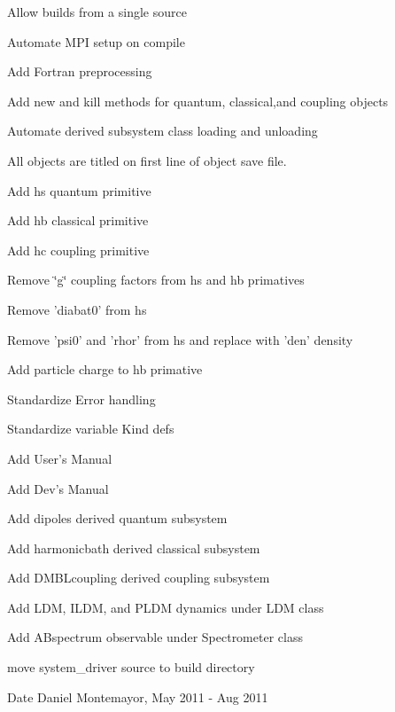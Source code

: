 \begin{DoxyItemize}
\item Allow builds from a single source
\item Automate M\+P\+I setup on compile
\item Add Fortran preprocessing
\item Add new and kill methods for quantum, classical,and coupling objects
\item Automate derived subsystem class loading and unloading
\item All objects are titled on first line of object save file.
\item Add hs quantum primitive
\item Add hb classical primitive
\item Add hc coupling primitive
\item Remove \char`\"{}g\char`\"{} coupling factors from hs and hb primatives
\item Remove 'diabat0' from hs
\item Remove 'psi0' and 'rhor' from hs and replace with 'den' density
\item Add particle charge to hb primative
\item Standardize Error handling
\item Standardize variable Kind defs
\item Add User's Manual
\item Add Dev's Manual
\item Add dipoles derived quantum subsystem
\item Add harmonicbath derived classical subsystem
\item Add D\+M\+B\+Lcoupling derived coupling subsystem
\item Add L\+D\+M, I\+L\+D\+M, and P\+L\+D\+M dynamics under L\+D\+M class
\item Add A\+Bspectrum observable under Spectrometer class
\item move system\+\_\+driver source to build directory
\end{DoxyItemize}

\begin{DoxyDate}{Date}
Daniel Montemayor, May 2011 -\/ Aug 2011 
\end{DoxyDate}
